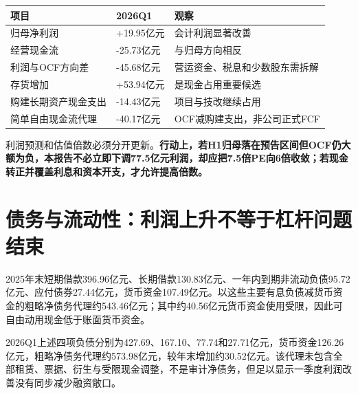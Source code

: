 \begin{exhibitbox}[Q1利润—现金缺口桥]
\noindent\begin{tabularx}{\textwidth}{L{4.0cm}R{2.2cm}X}
\toprule
\textbf{项目} & \textbf{2026Q1} & \textbf{观察} \\
\midrule
归母净利润 & +19.95亿元 & 会计利润显著改善 \\
经营现金流 & -25.73亿元 & 与归母方向相反 \\
利润与OCF方向差 & -45.68亿元 & 营运资金、税息和少数股东需拆解 \\
存货增加 & +53.94亿元 & 是现金占用重要候选 \\
购建长期资产现金支出 & -14.43亿元 & 项目与技改继续占用 \\
简单自由现金流代理 & -40.17亿元 & OCF减购建支出，非公司正式FCF \\
\bottomrule
\end{tabularx}
\end{exhibitbox}

\begin{keyinsight}
利润预测和估值倍数必须分开更新。\textbf{行动上，若H1归母落在预告区间但OCF仍大额为负，本报告不必立即下调77.5亿元利润，却应把7.5倍PE向6倍收敛；若现金转正并覆盖利息和资本开支，才允许提高倍数。}
\end{keyinsight}

\section{债务与流动性：利润上升不等于杠杆问题结束}

2025年末短期借款396.96亿元、长期借款130.83亿元、一年内到期非流动负债95.72亿元、应付债券27.44亿元，货币资金107.49亿元。以这些主要有息负债减货币资金的粗略净债务代理约543.46亿元；其中约40.56亿元货币资金使用受限，因此可自由动用现金低于账面货币资金。

2026Q1上述四项负债分别为427.69、167.10、77.74和27.71亿元，货币资金126.26亿元，粗略净债务代理约573.98亿元，较年末增加约30.52亿元。该代理未包含全部租赁、票据、衍生与受限现金调整，不是审计净债务，但足以显示一季度利润改善没有同步减少融资敞口。


